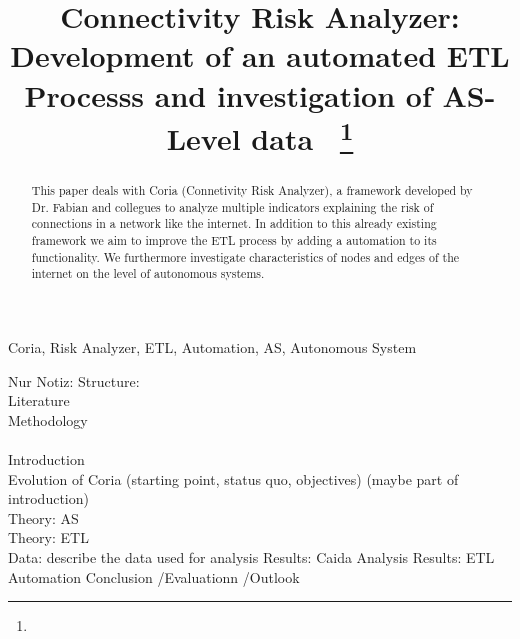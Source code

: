 \documentclass[conference]{IEEEtran}
\begin{document}
\title{Connectivity Risk Analyzer: Development of an automated ETL Processs and investigation of AS-Level data\
{\footnotesize \textsuperscript{}}
\thanks{}
}

\author{
\and
{}

}

\maketitle

\begin{abstract}

This paper deals with Coria (Connetivity Risk Analyzer), a framework developed by Dr. Fabian and collegues to analyze multiple indicators explaining the risk of connections in a network like the internet. In addition to this already existing framework we aim to improve the ETL process by adding a automation to its functionality. We furthermore investigate characteristics of nodes and edges of the internet on the level of autonomous systems.
\end{abstract}

\begin{IEEEkeywords}
Coria, Risk Analyzer, ETL, Automation, AS, Autonomous System
\end{IEEEkeywords}

Nur Notiz:
Structure: \\
Literature \\
Methodology \\
\\


Introduction \\
Evolution of Coria (starting point, status quo, objectives) (maybe part of introduction) \\

Theory: AS\\
Theory: ETL\\
Data: describe the data used for analysis 
Results: Caida Analysis
Results: ETL Automation
Conclusion /Evaluationn /Outlook
\end{document}
